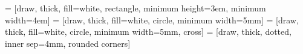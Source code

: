 \providecommand*{\fourier}[1]{\Fourier\!\left\lbrace{#1}\right\rbrace}

\newcommand{\overbar}[1]{\mkern 1.5mu\overline{\mkern-1.5mu#1\mkern-1.5mu}\mkern 1.5mu}
\newcommand{\vect}[1]{{\overbar{{#1}}}}

\newcommand{\numberset}{\mathbb}
\newcommand{\N}{\numberset{N}}
\newcommand{\Z}{\numberset{Z}}
\newcommand{\R}{\numberset{R}}

\renewcommand{\rho}{\varrho}
\renewcommand{\phi}{\varphi}
\renewcommand{\theta}{\vartheta}
\renewcommand{\epsilon}{\varepsilon}

 = [draw, thick, fill=white, rectangle, minimum height=3em, minimum width=4em]
 = 	[draw, thick, fill=white, circle, minimum width=5mm]
 =	[draw, thick, fill=white, circle, minimum width=5mm, cross]
 =	[draw, thick, dotted, inner sep=4mm, rounded corners]

